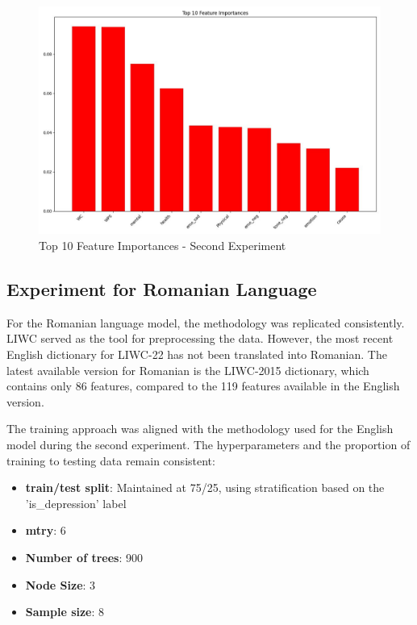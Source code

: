 \begin{figure}[htbp]
	\centering
		\includegraphics[scale=0.5]{LaTeX Bachelor Thesis Depression Signs Detection/figures/metrics/experiment2English/top10features.jpg}
	\caption{Top 10 Feature Importances - Second Experiment}
	\label{top10FeaturesSecondExperiment}
\end{figure}

\subsection{Experiment for Romanian Language}

\quad For the Romanian language model, the methodology was replicated consistently. LIWC served as the tool for preprocessing the data. However, the most recent English dictionary for LIWC-22 has not been translated into Romanian. The latest available version for Romanian is the LIWC-2015 dictionary, which contains only 86 features, compared to the 119 features available in the English version.

The training approach was aligned with the methodology used for the English model during the second experiment. The hyperparameters and the proportion of training to testing data remain consistent:

\begin{itemize}
\item \textbf{train/test split}: Maintained at 75/25, using stratification based on the 'is\_depression' label
\item \textbf{mtry}: 6
\item \textbf{Number of trees}: 900
\item \textbf{Node Size}: 3
\item \textbf{Sample size}: 8
\end{itemize}

